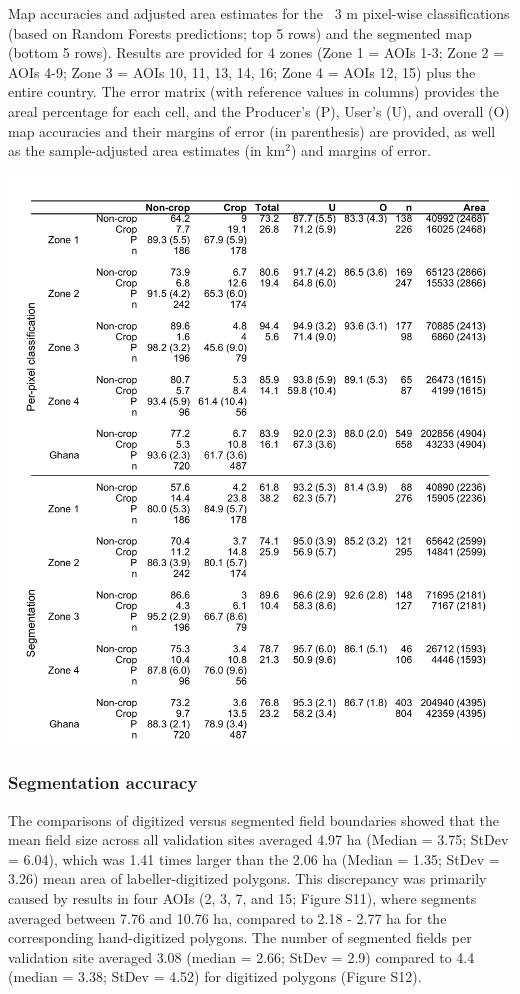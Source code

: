 \documentclass[11pt,a4paper]{article}
\begin{document}
\begin{table}
\caption{Map accuracies and adjusted area estimates for the ~3 m pixel-wise classifications (based on Random Forests predictions; top 5 rows) and the segmented map (bottom 5 rows). Results are provided for 4 zones (Zone 1 = AOIs 1-3; Zone 2 = AOIs 4-9; Zone 3 = AOIs 10, 11, 13, 14, 16; Zone 4 = AOIs 12, 15) plus the entire country. The error matrix (with reference values in columns) provides the areal percentage for each cell, and the Producer's (P), User's (U), and overall (O) map accuracies and their margins of error (in parenthesis) are provided, as well as the sample-adjusted area estimates (in km$^{2}$) and margins of error. }
\includegraphics[width = 18cm]{figures/table2.png}
\label{tab:mapaccuracy}
\end{table}

\hypertarget{segmentation-accuracy}{%
\subsubsection{Segmentation accuracy}\label{segmentation-accuracy}}

The comparisons of digitized versus segmented field boundaries showed
that the mean field size across all validation sites averaged 4.97 ha
(Median = 3.75; StDev = 6.04), which was 1.41 times larger than the 2.06
ha (Median = 1.35; StDev = 3.26) mean area of labeller-digitized
polygons. This discrepancy was primarily caused by results in four AOIs
(2, 3, 7, and 15; Figure S11), where segments averaged between 7.76 and
10.76 ha, compared to 2.18 - 2.77 ha for the corresponding
hand-digitized polygons. The number of segmented fields per validation
site averaged 3.08 (median = 2.66; StDev = 2.9) compared to 4.4 (median
= 3.38; StDev = 4.52) for digitized polygons (Figure S12).
\end{document}
